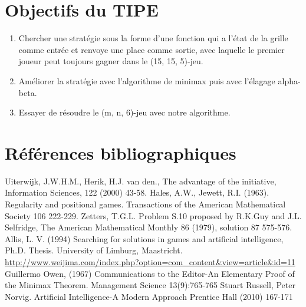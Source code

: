 \documentclass[12pt,a4paper]{article}
\begin{document}
\section*{\bfseries Objectifs du TIPE}
\begin{enumerate}
    \item Chercher une stratégie sous la forme d'une fonction qui a l'état de la grille comme entrée et renvoye une place comme sortie, avec laquelle le premier joueur peut toujours gagner dans le (15, 15, 5)-jeu.
    \item Améliorer la stratégie avec l'algorithme de minimax puis avec l'élagage alpha-beta.
    \item Essayer de résoudre le (m, n, 6)-jeu avec notre algorithme.
\end{enumerate}
\section*{\bfseries Références bibliographiques}
\begingroup
\renewcommand{\section}[2]{}%
\begin{thebibliography}{10}
    Uiterwijk, J.W.H.M., Herik, H.J. van den., The advantage of the initiative, Information Sciences, 122 (2000) 43-58.
    Hales, A.W., Jewett, R.I. (1963). Regularity and positional games. Transactions of the American Mathematical Society 106 222-229.
    Zetters, T.G.L. Problem S.10 proposed by R.K.Guy and J.L. Selfridge, The American Mathematical Monthly 86 (1979), solution 87 575-576.
    Allis, L. V. (1994) Searching for solutions in games and artificial intelligence, Ph.D. Thesis. University of Limburg, Maastricht.
    \url{http://www.weijima.com/index.php?option=com_content&view=article&id=11}
    Guillermo Owen, (1967) Communications to the Editor-An Elementary Proof of the Minimax Theorem. Management Science 13(9):765-765
    Stuart Russell, Peter Norvig. Artificial Intelligence-A Modern Approach Prentice Hall (2010) 167-171
\end{thebibliography}
\endgroup
\end{document}
